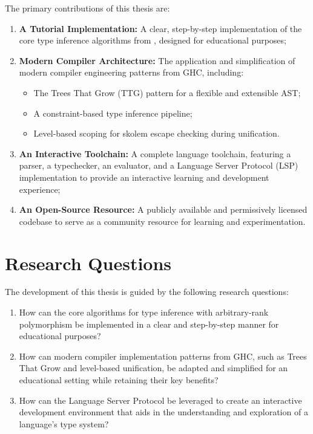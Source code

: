 The primary contributions of this thesis are:
\begin{enumerate}
    \item \textbf{A Tutorial Implementation:} A clear, step-by-step implementation of the core type inference algorithms from \cite{jones-practical-2007}, designed for educational purposes;
    \item \textbf{Modern Compiler Architecture:} The application and simplification of modern compiler engineering patterns from GHC, including:
          \begin{itemize}
              \item The Trees That Grow (TTG) pattern for a flexible and extensible AST;
              \item A constraint-based type inference pipeline;
              \item Level-based scoping for skolem escape checking during unification.
          \end{itemize}
    \item \textbf{An Interactive Toolchain:} A complete language toolchain, featuring a parser, a typechecker, an evaluator, and a Language Server Protocol (LSP) implementation to provide an interactive learning and development experience;
    \item \textbf{An Open-Source Resource:} A publicly available and permissively licensed codebase \cite{deemp-arbitrary-rank-tutorial} to serve as a community resource for learning and experimentation.
\end{enumerate}

\section{Research Questions}

The development of this thesis is guided by the following research questions:
\begin{enumerate}
    \item How can the core algorithms for type inference with arbitrary-rank polymorphism be implemented in a clear and step-by-step manner for educational purposes?
    \item How can modern compiler implementation patterns from GHC, such as Trees That Grow and level-based unification, be adapted and simplified for an educational setting while retaining their key benefits?
    \item How can the Language Server Protocol be leveraged to create an interactive development environment that aids in the understanding and exploration of a language's type system?
\end{enumerate}

